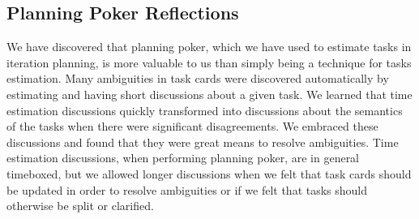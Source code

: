 
\subsection{Planning Poker Reflections}
We have discovered that planning poker, which we have used to estimate tasks in iteration planning, is more valuable to us than simply being a technique for tasks estimation. Many ambiguities in task cards were discovered automatically by estimating and having short discussions about a given task. We learned that time estimation discussions quickly transformed into discussions about the semantics of the tasks when there were significant disagreements. We embraced these discussions and found that they were great means to resolve ambiguities. Time estimation discussions, when performing planning poker, are in general timeboxed, but we allowed longer discussions when we felt that task cards should be updated in order to resolve ambiguities or if we felt that tasks should otherwise be split or clarified.


